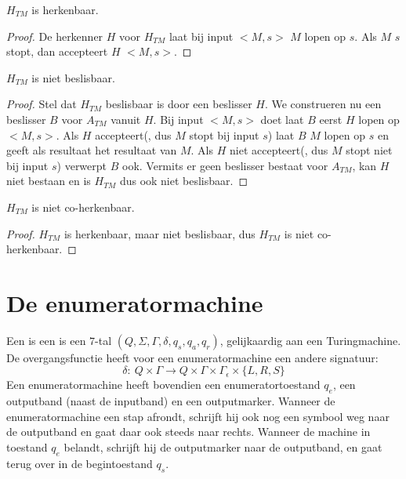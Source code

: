 \documentclass[main.tex]{subfiles}
\begin{document}
\begin{st}
  \label{st:h-tm-herk}
  $H_{TM}$ is herkenbaar.
  \begin{proof}
    De herkenner $H$ voor $H_{TM}$ laat bij input $<M,s>$ $M$ lopen op $s$.
    Als $M$ $s$ stopt, dan accepteert $H$ $<M,s>$.
  \end{proof}
\end{st}

\begin{st}
  \label{st:h-tm-niet-besl}
  $H_{TM}$ is niet beslisbaar.

  \begin{proof}
    Stel dat $H_{TM}$ beslisbaar is door een beslisser $H$.
    We construeren nu een beslisser $B$ voor $A_{TM}$ vanuit $H$.
    Bij input $<M,s>$ doet laat $B$ eerst $H$ lopen op $<M,s>$.
    Als $H$ accepteert(, dus $M$ stopt bij input $s$) laat $B$ $M$ lopen op $s$ en geeft als resultaat het resultaat van $M$.
    Als $H$ niet accepteert(, dus $M$ stopt niet bij input $s$) verwerpt $B$ ook.
    Vermits er geen beslisser bestaat voor $A_{TM}$, kan $H$ niet bestaan en is $H_{TM}$ dus ook niet beslisbaar.
  \end{proof}
\end{st}

\begin{gev}
  \label{gev:h-tm-niet-coherk}
  $H_{TM}$ is niet co-herkenbaar.
  \begin{proof}
    $H_{TM}$ is herkenbaar, maar niet beslisbaar, dus $H_{TM}$ is niet co-herkenbaar.
  \end{proof}
\end{gev}

\section{De enumeratormachine}
\label{sec:de-enumeratormachine}

\begin{de}
  Een  is een is een $7$-tal $(Q,\Sigma,\Gamma, \delta, q_{s}, q_{a}, q_{r})$, gelijkaardig aan een Turingmachine.
  De overgangsfunctie heeft voor een enumeratormachine een andere signatuur:
  \[ \delta:\ Q \times \Gamma \rightarrow Q \times \Gamma \times \Gamma_{\epsilon}\times \{L,R,S\} \]
  Een enumeratormachine heeft bovendien een enumeratortoestand $q_{e}$, een outputband (naast de inputband) en een outputmarker.
  Wanneer de enumeratormachine een stap afrondt, schrijft hij ook nog een symbool weg naar de outputband en gaat daar ook steeds naar rechts. Wanneer de machine in toestand $q_{e}$ belandt, schrijft hij de outputmarker naar de outputband, en gaat terug over in de begintoestand $q_{s}$.
\end{de}
\end{document}
